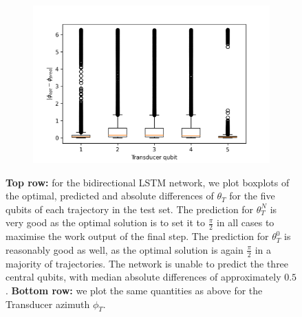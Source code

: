 \begin{figure}
\begin{subfigure}{0.32\textwidth}
\end{subfigure}
\begin{subfigure}{0.32\textwidth}
	\centering
	\includegraphics[width=\textwidth]{img/delta_phi_box}
\end{subfigure}
\caption{\textbf{Top row:} for the bidirectional LSTM network, we plot boxplots of the optimal, predicted and absolute differences of $\theta_T$ for the five qubits of each trajectory in the test set. The prediction for $\theta_T^N$ is very good as the optimal solution is to set it to $\frac{\pi}{2}$ in all cases to maximise the work output of the final step. The prediction for $\theta_T^0$ is reasonably good as well, as the optimal solution is again $\frac{\pi}{2}$ in a majority of trajectories. The network is unable to predict the three central qubits, with median absolute differences of approximately $0.5$. \textbf{Bottom row:} we plot the same quantities as above for the Transducer azimuth $\phi_T$.}
\label{bilstmbox}
\end{figure}